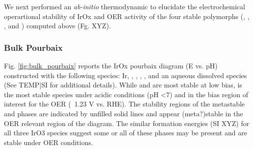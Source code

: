 

We next performed an {\it ab-initio} thermodynamic to elucidate the electrochemical operartional stability of IrOx
and OER activity of the four stable polymorphs (\rIrOtwo, \aIrOthree, \rIrOthree, and \bIrOthree) computed above (Fg. XYZ).


\subsubsection{Bulk Pourbaix}

Fig. \ref{fig:bulk_pourbaix} reports the IrOx pourbaix diagram (E vs. pH) constructed with the following species: Ir, \rIrOtwo, \aIrOthree,  \rIrOthree, \bIrOthree, and an aqueous dissolved  species (See TEMP|SI for additional details).
%
While \Ir and \rIrOtwo are most stable at low bias, \aIrOthree is the most stable species under acidic conditions (pH \textless 7) and in the bias region of interest for the OER (~1.23 V vs. RHE).
%
%
The stability regions of the metastable \rIrOthree and \bIrOthree phases are indicated by unfilled solid lines and appear (meta?)stable in the OER relevant region of the diagram.
%
The similar formation energies (SI XYZ) for all three IrO3 species suggest some or all of these  phases may be present and are stable under OER conditions.

